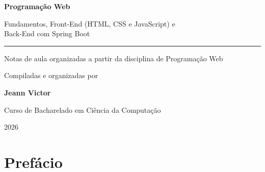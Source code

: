 \documentclass[12pt,a4paper,openany]{book}
\begin{document}
\begin{titlepage}
\centering
\vspace*{3cm}
{\Huge\bfseries\color{azullivro} Programação Web\par}
\vspace{1cm}
{\LARGE\color{laranjalivro} Fundamentos, Front-End (HTML, CSS e JavaScript) e\\Back-End com Spring Boot\par}
\vspace{2cm}\rule{0.65\textwidth}{0.4pt}\par\vspace{1.5cm}
{\Large Notas de aula organizadas a partir da disciplina de Programação Web\par}
\vspace{1cm}
{\large Compiladas e organizadas por\par}\vspace{0.3cm}
{\Large\bfseries Jeann Victor\par}
\vfill
{\large Curso de Bacharelado em Ciência da Computação\par}
{\large 2026\par}
\end{titlepage}
\frontmatter
\chapter*{Prefácio}

\tableofcontents
\mainmatter
\end{document}
